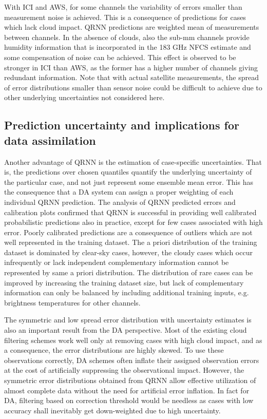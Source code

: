 \documentclass[amt, manuscript]{copernicus}
\begin{document}
With ICI and AWS, for some channels the variability of errors smaller than measurement noise is achieved. This is a consequence of predictions for cases which lack cloud impact. QRNN predictions are weighted mean of measurements between channels. In the absence of clouds, also the sub-mm channels provide humidity information that is incorporated in the 183 GHz NFCS estimate and some compensation of noise can be achieved. This effect is observed to be stronger in ICI than AWS, as the former has a higher number of channels giving redundant information. Note that with actual satellite measurements, the spread of error distributions smaller than sensor noise could be difficult to achieve due to other underlying uncertainties not considered here. 
 


\subsection{Prediction uncertainty and implications for data assimilation}

Another advantage of QRNN is the estimation of case-specific uncertainties. That is, the predictions over chosen quantiles quantify the underlying uncertainty of the particular case, and not just represent some ensemble mean error. This has the consequence that a DA system can assign a proper weighting of each individual QRNN prediction. The analysis of QRNN predicted errors and calibration plots confirmed that QRNN is successful in providing well calibrated probabilistic predictions also in practice, except for few cases associated with high error. Poorly calibrated predictions are a consequence of outliers which are not well represented in the training dataset. The a priori distribution of the training dataset is dominated by clear-sky cases, however, the cloudy cases which occur infrequently or lack independent complementary information cannot be represented by same a priori distribution. The distribution of rare cases can be improved by increasing the training dataset size, but lack of complementary information can only be balanced by including additional training inputs, e.g. brightness temperatures for other channels. 

The symmetric and low spread error distribution with uncertainty estimates is also an important result from the DA perspective. Most of the existing cloud filtering schemes work well only at removing cases with high cloud impact, and as a consequence, the error distributions are highly skewed. To use these observations correctly, DA schemes often inflate their assigned observation errors at the cost of artificially suppressing the observational impact. However, the symmetric error distributions obtained from QRNN allow effective utilization of almost complete data without the need for artificial error inflation. In fact for DA, filtering based on correction threshold would be needless as cases with low accuracy shall inevitably get down-weighted due to high uncertainty.   
\end{document}
